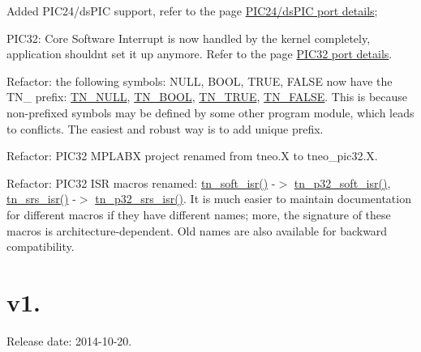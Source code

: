 \begin{DoxyItemize}
\item Added P\+I\+C24/ds\+P\+IC support, refer to the page \hyperlink{arch_specific_pic24_details}{P\+I\+C24/ds\+P\+IC port details};
\item P\+I\+C32\+: Core Software Interrupt is now handled by the kernel completely, application shouldn\textquotesingle{}t set it up anymore. Refer to the page \hyperlink{arch_specific_pic32_details}{P\+I\+C32 port details}.
\item Refactor\+: the following symbols\+: {\ttfamily N\+U\+LL}, {\ttfamily B\+O\+OL}, {\ttfamily T\+R\+UE}, {\ttfamily F\+A\+L\+SE} now have the {\ttfamily T\+N\+\_\+} prefix\+: {\ttfamily \hyperlink{tn__common_8h_adbf9c425147511997eb1396c4afeac40}{T\+N\+\_\+\+N\+U\+LL}}, {\ttfamily \hyperlink{tn__common_8h_a9f76389d1506addfc7542f54e484a92c}{T\+N\+\_\+\+B\+O\+OL}}, {\ttfamily \hyperlink{tn__common_8h_a87ed178a95496e2f19aa670adc4886b3}{T\+N\+\_\+\+T\+R\+UE}}, {\ttfamily \hyperlink{tn__common_8h_aa32a38a7d2e3b7983e53a61ab05417ee}{T\+N\+\_\+\+F\+A\+L\+SE}}. This is because non-\/prefixed symbols may be defined by some other program module, which leads to conflicts. The easiest and robust way is to add unique prefix.
\item Refactor\+: P\+I\+C32 M\+P\+L\+A\+BX project renamed from {\ttfamily tneo.\+X} to {\ttfamily tneo\+\_\+pic32.\+X}.
\item Refactor\+: P\+I\+C32 I\+SR macros renamed\+: {\ttfamily \hyperlink{tn__arch__pic32_8h_afde61cfabbeed1562ea2135fea8e919b}{tn\+\_\+soft\+\_\+isr()}} -\/$>$ {\ttfamily \hyperlink{tn__arch__pic32_8h_a02d853d8d573f928fb8da65ef0c2bc8e}{tn\+\_\+p32\+\_\+soft\+\_\+isr()}}, {\ttfamily \hyperlink{tn__arch__pic32_8h_a714962dd7eb6b94feee7f4d769b601c0}{tn\+\_\+srs\+\_\+isr()}} -\/$>$ {\ttfamily \hyperlink{tn__arch__pic32_8h_a523bb667617e6bb6f68a8f85855030a5}{tn\+\_\+p32\+\_\+srs\+\_\+isr()}}. It is much easier to maintain documentation for different macros if they have different names; more, the signature of these macros is architecture-\/dependent. Old names are also available for backward compatibility.
\end{DoxyItemize}\hypertarget{changelog_changelog_v1_03}{}\section{v1.}\label{changelog_changelog_v1_03}
Release date\+: 2014-\/10-\/20.


